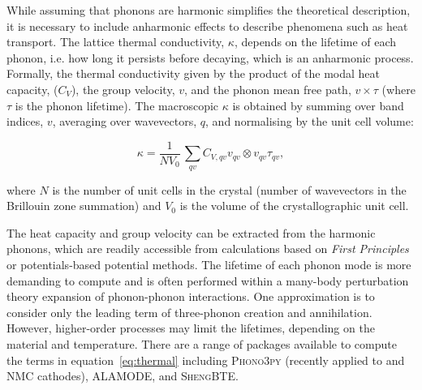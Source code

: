 \documentclass[../main.tex]{subfiles}
\begin{document}
While assuming that phonons are harmonic simplifies the theoretical description, it is necessary to include anharmonic effects to describe phenomena such as heat transport. The lattice thermal conductivity, $\kappa$, depends on the lifetime of each phonon, i.e. how long it persists before decaying, which is an anharmonic process. Formally, the thermal conductivity given by the product of the modal heat capacity, ($C_V$), the group velocity, $v$, and the phonon mean free path, $v \times \tau$ (where $\tau$ is the phonon lifetime). The macroscopic $\kappa$ is obtained by summing over band indices, $v$, averaging over wavevectors, $q$, and normalising by the unit cell volume:

\begin{equation}
    \kappa = \frac{1}{NV_0} \,\sum_{qv} C_{V,qv} v_{qv} \otimes v_{qv} \tau_{qv},
    \label{eq:thermal}
\end{equation}

where $N$ is the number of unit cells in the crystal (number of wavevectors in the Brillouin zone summation) and $V_0$ is the volume of the crystallographic unit cell.

The heat capacity and group velocity can be extracted from the harmonic phonons, which are readily accessible from calculations based on \textit{First Principles} or potentials-based potential methods. The lifetime of each phonon mode is more demanding to compute and is often performed within a many-body perturbation theory expansion of phonon-phonon interactions. One approximation is to consider only the leading term of three-phonon creation and annihilation. \cite{togo_distributions_2015} However, higher-order processes may limit the lifetimes, depending on the material and temperature. There are a range of packages available to compute the terms in equation~\ref{eq:thermal} including \textsc{Phono3py} \cite{togo_distributions_2015} (recently applied to  and NMC cathodes)\cite{yang2019highly,yang2020chemical}, \textsc{ALAMODE}\cite{tadano2014anharmonic}, and \textsc{ShengBTE}\cite{ShengBTE_2014}.

 
\end{document}
